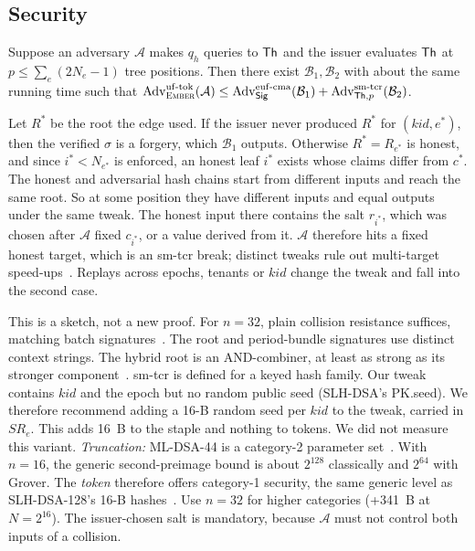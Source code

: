 \subsection{Security}
\label{sec:security}
\begin{theorem}
\label{thm:uf}
Suppose an adversary $\mathcal{A}$ makes $q_h$ queries to $\mathsf{Th}$ and the issuer evaluates $\mathsf{Th}$ at $p\le\sum_e(2N_e-1)$ tree positions. Then there exist $\mathcal{B}_1,\mathcal{B}_2$ with about the same running time such that
$\mathrm{Adv}^{\mathrm{uf\text{-}tok}}_{\textsc{Ember}}(\mathcal{A})\le\mathrm{Adv}^{\mathrm{euf\text{-}cma}}_{\mathsf{Sig}}(\mathcal{B}_1)+\mathrm{Adv}^{\mathrm{sm\text{-}tcr}}_{\mathsf{Th},p}(\mathcal{B}_2)$.
\end{theorem}
\begin{IEEEproof}
Let $R^*$ be the root the edge used. If the issuer never produced $R^*$ for $(\mathit{kid},e^*)$, then the verified $\sigma$ is a forgery, which $\mathcal{B}_1$ outputs. Otherwise $R^*=R_{e^*}$ is honest, and since $i^*<N_{e^*}$ is enforced, an honest leaf $i^*$ exists whose claims differ from $c^*$. The honest and adversarial hash chains start from different inputs and reach the same root. So at some position they have different inputs and equal outputs under the same tweak. The honest input there contains the salt $r_{i^*}$, which was chosen after $\mathcal{A}$ fixed $c_{i^*}$, or a value derived from it. $\mathcal{A}$ therefore hits a fixed honest target, which is an sm-tcr break; distinct tweaks rule out multi-target speed-ups~\cite{sphincsplus2019}. Replays across epochs, tenants or $\mathit{kid}$ change the tweak and fall into the second case.
\end{IEEEproof}
This is a sketch, not a new proof. For $n=32$, plain collision resistance suffices, matching batch signatures~\cite{batchsig2024}. The root and period-bundle signatures use distinct context strings. The hybrid root is an AND-combiner, at least as strong as its stronger component~\cite{bindel2017hybrid}. sm-tcr is defined for a keyed hash family. Our tweak contains $\mathit{kid}$ and the epoch but no random public seed (SLH-DSA's PK.seed). We therefore recommend adding a 16-B random seed per $\mathit{kid}$ to the tweak, carried in $SR_e$. This adds 16~B to the staple and nothing to tokens. We did not measure this variant. \emph{Truncation:} ML-DSA-44 is a category-2 parameter set~\cite{fips204}. With $n=16$, the generic second-preimage bound is about $2^{128}$ classically and $2^{64}$ with Grover. The \emph{token} therefore offers category-1 security, the same generic level as SLH-DSA-128's 16-B hashes~\cite{fips205}. Use $n=32$ for higher categories (+341~B at $N=2^{16}$). The issuer-chosen salt is mandatory, because $\mathcal{A}$ must not control both inputs of a collision.

